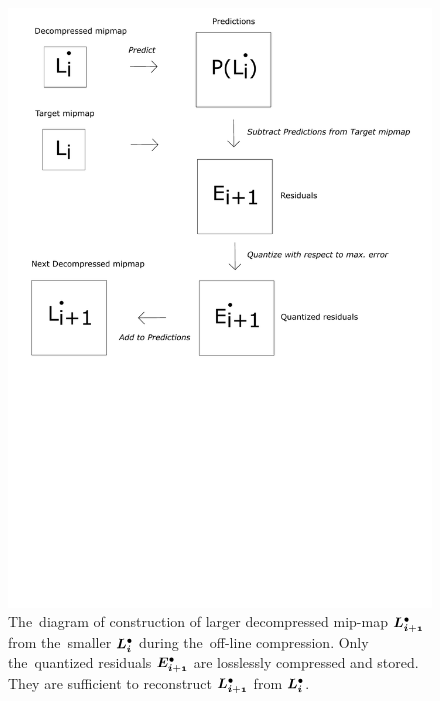 \begin{figure}
	\includegraphics[trim={0 12cm 1cm 0cm}, clip, width=1\textwidth]{figures/single_reconst.pdf}\centering
	\caption{The~diagram of construction of larger decompressed mip-map $\ldot{i+1}$ from the~smaller $\ldot{i}$ during the~off-line compression. Only the~quantized residuals $\objdot{E}{i+1}$ are losslessly compressed and stored. They are sufficient to reconstruct $\ldot{i+1}$ from $\ldot{i}$.}
	\label{fig:single_reconst}
\end{figure}

